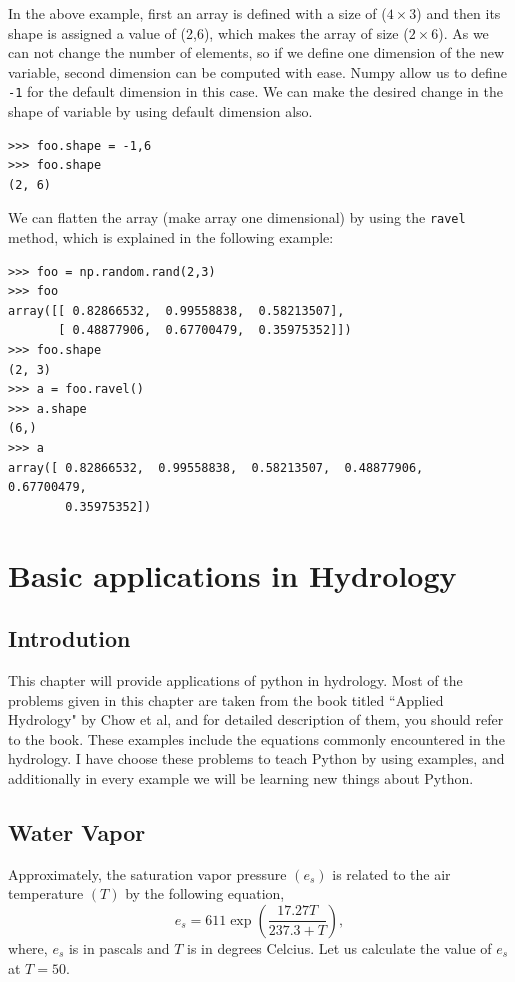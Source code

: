 \documentclass[10pt]{book}
\begin{document}
{In the above example, first an array is defined with a size of ($ 4 \times 3$) and then its shape is assigned a value of (2,6), which makes the array of size ($2 \times 6$). As we can not change the number of elements, so if we define one dimension of the new variable, second dimension can be computed  with ease. Numpy allow us to define \verb"-1" for the default dimension in this case. We can make the desired change in the shape of variable by using default dimension also.
\beforeverb \begin{verbatim}
>>> foo.shape = -1,6
>>> foo.shape
(2, 6)
\end{verbatim} \afterverb
{}

We can flatten the array (make array one dimensional) by using the \verb"ravel" method, which is explained in the following example:
\beforeverb
\begin{verbatim}
>>> foo = np.random.rand(2,3)
>>> foo
array([[ 0.82866532,  0.99558838,  0.58213507],
       [ 0.48877906,  0.67700479,  0.35975352]])
>>> foo.shape
(2, 3)
>>> a = foo.ravel()
>>> a.shape
(6,)
>>> a
array([ 0.82866532,  0.99558838,  0.58213507,  0.48877906,  0.67700479,
        0.35975352])
\end{verbatim}
\afterverb

\chapter{Basic applications in Hydrology}
\section{Introdution}
This chapter will provide applications of python in hydrology. Most of the problems given in this chapter are taken from the book titled ``Applied Hydrology" by Chow et al, and for detailed description of them, you should refer to the book. These examples include the equations commonly encountered in the hydrology. I have choose these problems to teach Python by using examples, and additionally in every example we will be learning new things about Python. \\

\section{Water Vapor}
Approximately, the saturation vapor pressure $(e_s)$ is related to the air temperature $(T)$ by the following equation,
\begin{equation}
e_s = 611 \exp\left( \frac{17.27T}{237.3+T} \right),
\end{equation}
where, $e_s$ is in pascals and $T$ is in degrees Celcius. Let us calculate the value of $e_s$ at $T=50$.

}
\end{document}
